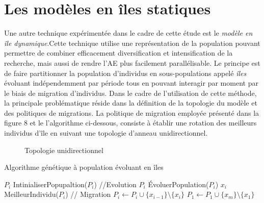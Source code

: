 \documentclass[twocolumn]{article}
\begin{document}
\section{Les modèles en îles statiques}
Une autre technique expérimentée dans le cadre de cette étude est le \emph{modèle en île dynamique}.Cette technique utilise une représentation de la population pouvant permettre de  combiner efficacement  diversification et intensification  de la recherche, mais aussi de rendre l'AE plus facilement parallélisable. Le principe est de faire partitionner la population d'individus en sous-populations appelé \emph{îles}  évoluant indépendemment par période tous en pouvant interagir par moment par le biais de migration d'individus.
Dans le cadre de l'utilisation de cette méthode, la principale problématique réside dans la définition de la topologie du modèle et des politiques de migrations. La politique de migration employée présenté dans la figure 8 et le l'algorithme ci-dessous, consiste à établir une rotation des meilleurs individus d'île en suivant une topologie d'anneau unidirectionnel.
\begin{figure}[h]
    \centering
    \caption{Topologie unidirectionnel}
\end{figure}

\begin{algorithm}
\caption{Algorithme génétique à population évoluant  en îles }
\begin{algorithmic}[1]
    \State  $P_i$ \gets IntinialiserPopupaltion($P_i$)
\EndFor
{}
    \State   //Evolution
        \State $P_i$ \gets ÉvoluerPopulation($P_i$)
        \State $x_i$ \gets MeilleurIndividu($P_i$)
    \EndFor
    \State // Migration
        \State $P_i \gets P_i \cup  \{ x_{i-1} \} \setminus \{x_i \} $
    \EndFor 
    \State $P_1 \gets P_1 \cup  \{ x_{m} \} \setminus \{x_1 \} $
\EndWhile
\end{algorithmic}
\end{algorithm}
\end{document}
